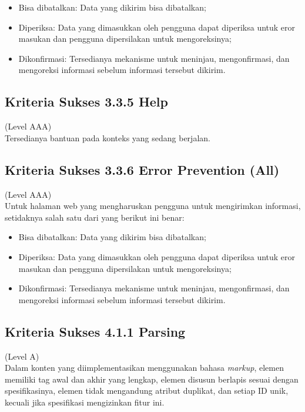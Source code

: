 \begin{itemize}
	\item Bisa dibatalkan: Data yang dikirim bisa dibatalkan;
	\item Diperiksa: Data yang dimasukkan oleh pengguna dapat diperiksa untuk eror masukan dan pengguna dipersilakan untuk mengoreksinya;
	\item Dikonfirmasi: Tersedianya mekanisme untuk meninjau, mengonfirmasi, dan mengoreksi informasi sebelum informasi tersebut dikirim.
\end{itemize}


\subsection{Kriteria Sukses 3.3.5 Help}
\label{subsec:kriteria_3.3.5}
(Level AAA) \\

Tersedianya bantuan pada konteks yang sedang berjalan.


\subsection{Kriteria Sukses 3.3.6 Error Prevention (All)}
\label{subsec:kriteria_3.3.6}
(Level AAA) \\

Untuk halaman web yang mengharuskan pengguna untuk mengirimkan informasi, setidaknya salah satu dari yang berikut ini benar:

\begin{itemize}
	\item Bisa dibatalkan: Data yang dikirim bisa dibatalkan;
	\item Diperiksa: Data yang dimasukkan oleh pengguna dapat diperiksa untuk eror masukan dan pengguna dipersilakan untuk mengoreksinya;
	\item Dikonfirmasi: Tersedianya mekanisme untuk meninjau, mengonfirmasi, dan mengoreksi informasi sebelum informasi tersebut dikirim.
\end{itemize}

\subsection{Kriteria Sukses 4.1.1 Parsing}
\label{subsec:kriteria_4.1.1}
(Level A) \\

Dalam konten yang diimplementasikan menggunakan bahasa \textit{markup}, elemen memiliki tag awal dan akhir yang lengkap, elemen disusun berlapis sesuai dengan spesifikasinya, elemen tidak mengandung atribut duplikat, dan setiap ID unik, kecuali jika spesifikasi mengizinkan fitur ini.

